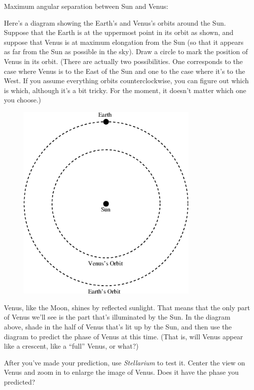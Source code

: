 Maximum angular separation between Sun and Venus:

\answerspace{ 0.7in}

Here's a diagram showing the Earth's and Venus's orbits around the
Sun.  Suppose that the Earth is at the uppermost point in its orbit as
shown, and suppose that Venus is at maximum elongation from the Sun
(so that it appears as far from the Sun as possible in the sky).  Draw
a circle to mark the position of Venus in its orbit.  (There are
actually two possibilities.  One corresponds to the case where Venus
is to the East of the Sun and one to the case where it's to the West.
If you assume everything orbits
counterclockwise, you can figure out which is which, although
it's a bit tricky.  For the moment, it doesn't matter which one you choose.)

\begin{figure}[h]
\centerline{\includegraphics[width=3.5in]{phasesofvenus/venus1.eps}}
\end{figure}


Venus, like the Moon, shines by reflected sunlight.  That means that
the only part of Venus we'll see is the part that's illuminated by the 
Sun.  In the diagram above, shade in the half of Venus that's lit up by
the Sun, and then use the diagram to predict the phase of Venus
at this time.  (That is, will Venus appear like a crescent, like
a ``full'' Venus, or what?)

\answerspace{ 0.7in}

\pagebreak[2]
After you've made your prediction, use \textit{Stellarium}
to test it.
Center the view on Venus and zoom in to enlarge the image of Venus.
Does it have the phase you predicted?


